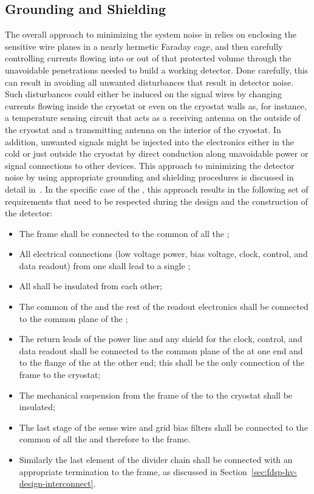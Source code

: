 \subsection{Grounding and Shielding}
\label{sec:fdsp-tpcelec-design-grounding}

The overall approach to minimizing the system noise in  
relies on enclosing the sensitive wire planes in a nearly hermetic 
Faraday cage, and then carefully controlling currents flowing into or 
out of that protected volume through the unavoidable penetrations 
needed to build a working detector. Done carefully, this can result 
in avoiding all unwanted disturbances that result in detector noise. 
Such disturbances could either be induced on the signal wires by 
changing currents flowing inside the cryostat or even on the cryostat 
walls as, for instance, a temperature sensing circuit that acts as a 
receiving antenna on the outside of the cryostat and a transmitting 
antenna on the interior of the cryostat. In addition, unwanted signals 
might be injected into the electronics either in the cold or just 
outside the cryostat by direct conduction along unavoidable power 
or signal connections to other devices. This approach to minimizing
the detector noise by using appropriate grounding and shielding procedures
is discussed in detail in~\cite{radekaNoise}. In the specific case
of the  , this approach results in the 
following set of requirements that need to be respected during the
design and the construction of the detector:
\begin{itemize}
\item{The  frame shall be connected to the common of
all the  ;}
\item{All electrical connections (low voltage power, bias voltage,
clock, control, and data readout) from one  shall lead to a 
single ;}
\item{All  shall be insulated from each other;}
\item{The common of the   and the rest of the 
 readout electronics shall be connected to
the common plane of the ;}
\item{The return leads of the  power line and any shield
for the clock, control, and data readout shall be connected
to the common plane of the  at one end and
to the flange of the  at the other end; this shall be 
the only connection of the  frame to the cryostat;}
\item{The mechanical suspension from the frame of the 
to the cryostat shall be insulated;}
\item{The last stage of the sense wire and grid bias filters shall be
connected to the common of all the   and therefore
to the  frame.}
\item{Similarly the last element of the  divider chain shall
be connected with an appropriate termination to the 
frame, as discussed in Section~\ref{sec:fdsp-hv-design-interconnect}.}
\end{itemize}

